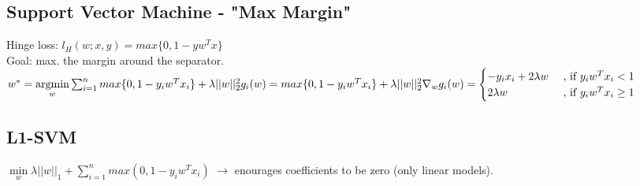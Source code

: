 
\subsection*{Support Vector Machine - "Max Margin"}
Hinge loss: $l_H(w;x,y) = max \{0,1-y w^T x\}$\\
Goal: max. the margin around the separator.\\
$w^* = \underset{w}{\operatorname{argmin}} \sum_{i=1}^n  max \{0,1-y_i w^T x_i\} + \lambda ||w||_2^2\\
g_i(w) = max \{0,1-y_i w^T x_i\} + \lambda ||w||_2^2\\
\nabla_w g_i(w) = \begin{cases}
    -y_i x_i + 2\lambda w &\text{ , if $y_i w^T x_i<1$}\\
		2\lambda w &\text{ , if $y_i w^T x_i \geq 1$}
\end{cases}$

\subsection*{L1-SVM}
$\underset{w}{\operatorname{min}} \lambda ||w||_1 + \sum_{i=1}^n max(0,1-y_i w^T x_i)$ 
$\rightarrow$ enourages coefficients to be zero (only linear models).


